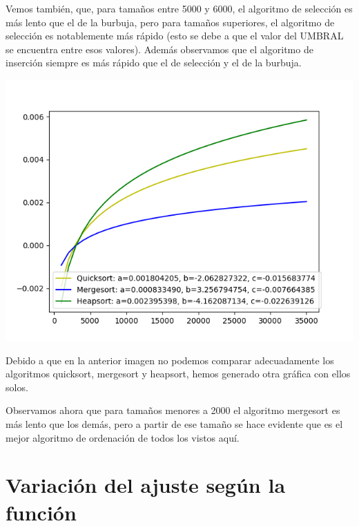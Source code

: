 \documentclass[11pt]{article}
\begin{document}
Vemos también, que, para tamaños entre 5000 y 6000, el algoritmo de selección es más lento que el de la burbuja, pero para tamaños superiores, el algoritmo de selección es notablemente más rápido (esto se debe a que el valor del UMBRAL se encuentra entre esos valores). Además observamos que el algoritmo de inserción siempre es más rápido que el de selección y el de la burbuja.

\begin{center}
\includegraphics[scale=0.5]{../graficos/ordenacion/ordenacion_sort_only_antonio.png}
\end{center}

Debido a que en la anterior imagen no podemos comparar adecuadamente los algoritmos quicksort, mergesort y heapsort, hemos generado otra gráfica con ellos solos. 

Observamos ahora que para tamaños menores a 2000 el algoritmo mergesort es más lento que los demás, pero a partir de ese tamaño se hace evidente que es el mejor algoritmo de ordenación de todos los vistos aquí.

\section{Variación del ajuste según la función}
\end{document}
